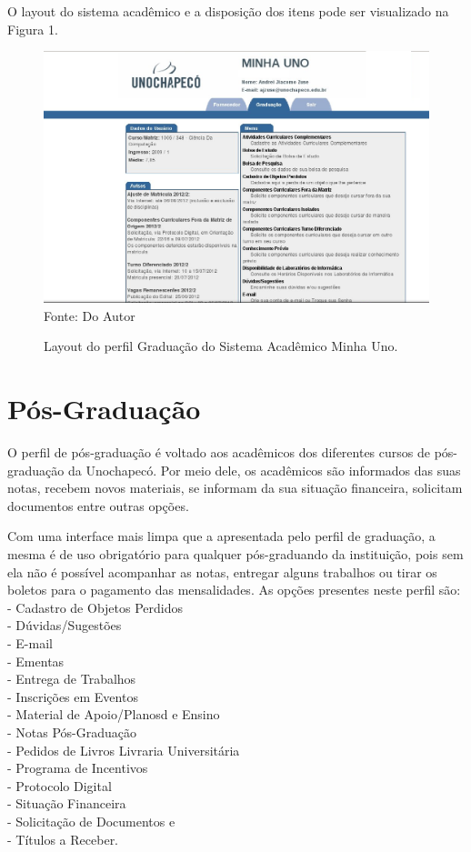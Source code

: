 O layout do sistema acadêmico e a disposição dos itens pode ser visualizado na Figura 1.

\begin{figure}[!htb]
     \centering
     \caption[Layout do Sistema - Perfil Graduação]{Layout do perfil Graduação do Sistema Acadêmico Minha Uno.}
     \includegraphics[scale=0.3]{imagens/GraduacaoCorrigida.png}
     \\ Fonte: Do Autor
\end{figure}

\newpage
\section{Pós-Graduação}
O perfil de pós-graduação é voltado aos acadêmicos dos diferentes cursos de pós-graduação da Unochapecó. 
Por meio dele, os acadêmicos são informados das  suas notas, recebem novos materiais, 
se informam da sua situação financeira, solicitam documentos entre outras opções.

Com uma interface mais limpa que a apresentada pelo perfil de graduação, a mesma é de uso obrigatório para qualquer 
pós-graduando da instituição, pois sem ela não é possível acompanhar as notas, entregar alguns trabalhos ou 
tirar os boletos para o pagamento das mensalidades. As opções presentes neste perfil são: \\
- Cadastro de Objetos Perdidos \\
- Dúvidas/Sugestões \\
- E-mail \\
- Ementas \\
- Entrega de Trabalhos \\
- Inscrições em Eventos \\
- Material de Apoio/Planosd e Ensino \\
- Notas Pós-Graduação \\
- Pedidos de Livros Livraria Universitária \\
- Programa de Incentivos \\
- Protocolo Digital \\
- Situação Financeira \\
- Solicitação de Documentos e \\
- Títulos a Receber. \\

